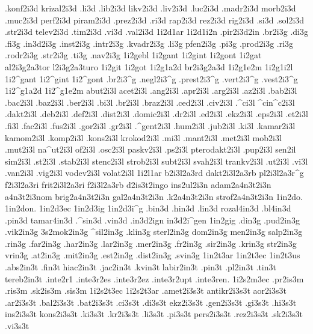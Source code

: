 {.konf2i3d krizal2i3d .li3d .lib2i3d likv2i3d .liv2i3d .luc2i3d
.madr2i3d morb2i3d .muc2i3d perf2i3d piram2i3d .prez2i3d .ri3d
rap2i3d rez2i3d rig2i3d .si3d .sol2i3d .str2i3d telev2i3d .tim2i3d
.vi3d .val2i3d
%
1i2d1ar  1i2d1i2n .pir2i3d2in
 
.br2i3g .di3g .fi3g .in3d2i3g .inst2i3g .intr2i3g .kvadr2i3g
.li3g pfen2i3g .pi3g .prod2i3g .ri3g .rodr2i3g .str2i3g .ti3g .nav2i3g
%
1i2gebl
1i2gant 1i2gint 1i2gont
1i2gat al2i3g2a3tor l2i3g2a3turo
1i2git 1i2got
%
1i2g1a2d br2i3g2a3d
1i2g1e2m 1i2g1i2l
  1i2^gant 1i2^gint 1i2^gont
.br2i3^g .negl2i3^g .prest2i3^g .vert2i3^g .vest2i3^g
1i2^g1a2d 1i2^g1e2m
abut2i3l acet2i3l .ang2i3l .apr2i3l .arg2i3l .az2i3l .bab2i3l .bac2i3l
.baz2i3l .ber2i3l .bi3l .br2i3l .braz2i3l .ced2i3l .civ2i3l .^ci3l
^cin^c2i3l .dakt2i3l .deb2i3l .def2i3l .dist2i3l .domic2i3l .dr2i3l
.ed2i3l .ekz2i3l .eps2i3l .et2i3l .fi3l .fac2i3l .fus2i3l .gor2i3l
.gr2i3l .^gent2i3l .hum2i3l .jub2i3l .ki3l .kamar2i3l kamom2i3l
.komp2i3l .kons2i3l krokod2i3l .mi3l .mant2i3l .met2i3l mob2i3l
.mut2i3l na^ut2i3l of2i3l .osc2i3l paskv2i3l .ps2i3l pterodakt2i3l
.pup2i3l sen2il sim2i3l .st2i3l .stab2i3l stenc2i3l strob2i3l subt2i3l
svah2i3l trankv2i3l .ut2i3l .vi3l .van2i3l .vig2i3l vodev2i3l volat2i3l
1i2l1ar
b2i3l2a3rd dakt2i3l2a3rb pl2i3l2a3r^g f2i3l2a3ri frit2i3l2a3ri f2i3l2a3rb
d2is3t2ingo
ins2ul2i3n
adam2a4n3t2i3n a4n3t2i3nom brig2a4n3t2i3n gal2a4n3t2i3n .k2a4n3t2i3n
strof2a4n3t2i3n
  1in2do. 1in2don. 1in2d3ec 1in2d3ig 1in2d3i^g
.bin3d .hin3d .lin3d rozal4in3d .bl4in3d .pin3d tamar4in3d .^sin3d .vin3d 
.in3d2ign in3d2i^gen
 1in2gig
.din3g .pud2in3g .vik2in3g 3s2mok2in3g ^sil2in3g .klin3g sterl2in3g
dom2in3g men2in3g salp2in3g .rin3g .far2in3g .har2in3g
.lar2in3g .mer2in3g .fr2in3g .sir2in3g .krin3g str2in3g vrin3g
.at2in3g .mit2in3g .est2in3g .dist2in3g .svin3g
 1in2t3ar 1in2t3ec 1in2t3us
.abs2in3t .fin3t hiac2in3t .jac2in3t .kvin3t labir2in3t .pin3t .pl2in3t
.tin3t tereb2in3t
.inte2r1
.inte3r2es .inte3r2ez .inte3r2upt  
  .inte3ren.
 1i2s2m3ec
.pr2is3m .ris3m .sk2is3m .sis3m
 1i2s2t3ec 1i2s2t3ar
%
.amet2i3s3t antikr2i3s3t aor2i3s3t .ar2i3s3t .bal2i3s3t .bat2i3s3t .ci3s3t
.di3s3t ekz2i3s3t .gen2i3s3t .gi3s3t .hi3s3t ins2i3s3t kons2i3s3t .ki3s3t
.kr2i3s3t .li3s3t .pi3s3t pers2i3s3t .rez2i3s3t .sk2i3s3t .vi3s3t
}
